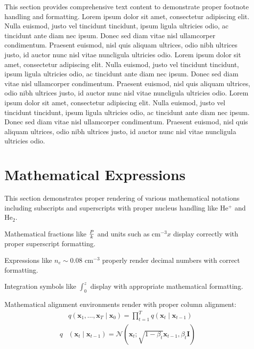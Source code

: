 \documentclass{article}
\begin{document}
This section provides comprehensive text content to demonstrate proper footnote handling and formatting.
Lorem ipsum dolor sit amet, consectetur adipiscing elit. Nulla euismod, justo vel tincidunt tincidunt, ipsum ligula ultricies odio,
ac tincidunt ante diam nec ipsum. Donec sed diam vitae nisl ullamcorper condimentum. Praesent euismod, nisl quis aliquam ultrices, odio nibh ultrices justo, id auctor nunc nisl vitae nuncligula ultricies odio.
Lorem ipsum dolor sit amet, consectetur adipiscing elit. Nulla euismod, justo vel tincidunt tincidunt, ipsum ligula ultricies odio,
ac tincidunt ante diam nec ipsum. Donec sed diam vitae nisl ullamcorper condimentum. Praesent euismod, nisl quis aliquam ultrices, odio nibh ultrices justo, id auctor nunc nisl vitae nuncligula ultricies odio.
Lorem ipsum dolor sit amet, consectetur adipiscing elit. Nulla euismod, justo vel tincidunt tincidunt, ipsum ligula ultricies odio,
ac tincidunt ante diam nec ipsum. Donec sed diam vitae nisl ullamcorper condimentum. Praesent euismod, nisl quis aliquam ultrices, odio nibh ultrices justo, id auctor nunc nisl vitae nuncligula ultricies odio.

\section{Mathematical Expressions}

This section demonstrates proper rendering of various mathematical notations including subscripts and superscripts with proper nucleus handling like He$^+$ and He$_2$.

Mathematical fractions like ${P \over k}$ and units such as cm$^{-3} x$ display correctly with proper superscript formatting.

Expressions like $n_e \sim 0.08$ cm$^{-3}$ properly render decimal numbers with correct formatting.

Integration symbols like $\int_0^z$ display with appropriate mathematical formatting.

Mathematical alignment environments render with proper column alignment:
\begin{align}
    &q\left(\mathbf{x}_1, \ldots, \mathbf{x}_T \mid \mathbf{x}_0\right) =\prod_{t=1}^T q\left(\mathbf{x}_t \mid \mathbf{x}_{t-1}\right) \\
q&\left(\mathbf{x}_t \mid \mathbf{x}_{t-1}\right)  =\mathcal{N}\left(\mathbf{x}_t; \sqrt{1-\beta_t} \mathbf{x}_{t-1}, \beta_t \mathbf{I}\right)
\end{align}
\end{document}
